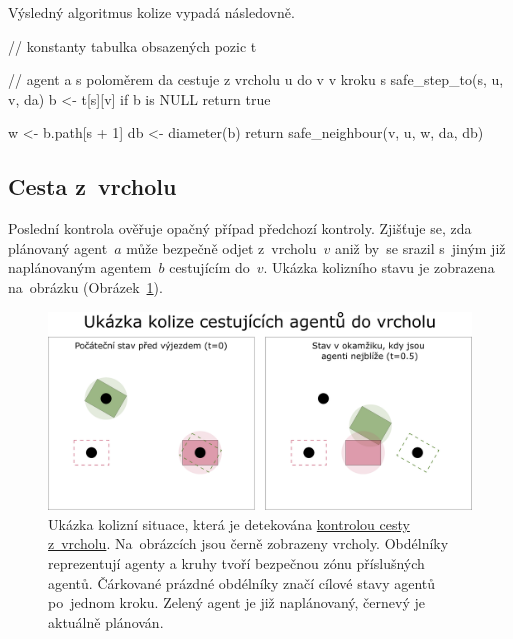Výsledný algoritmus kolize vypadá následovně.

\begin{code}[fontsize=\footnotesize]
// konstanty tabulka obsazených pozic t

// agent a s poloměrem da cestuje z vrcholu u do v v kroku s
safe_step_to(s, u, v, da)
  b <- t[s][v]
  if b is NULL
    return true

  w <- b.path[s + 1]
  db <- diameter(b)
  return safe_neighbour(v, u, w, da, db)
\end{code}

\subsection{Cesta z~vrcholu}\label{subsec:cesta_z_vrcholu}



Poslední kontrola ověřuje opačný případ předchozí kontroly.
Zjišťuje se, zda plánovaný agent~$a$ může bezpečně odjet z~vrcholu~$v$
aniž by~se srazil s~jiným již naplánovaným agentem~$b$ cestujícím do~$v$.
Ukázka kolizního stavu je zobrazena na~obrázku (Obrázek~\ref{fig:kolize_cesta_z}).

\begin{figure}[h]
	\centering
	\includegraphics[width=\textwidth]{../img/kolize_cesta_z}
	\caption{
		Ukázka kolizní situace, která je detekována \hyperref[subsec:cesta_z_vrcholu]{kontrolou cesty z~vrcholu}.
		Na~obrázcích jsou černě zobrazeny vrcholy.
		Obdélníky reprezentují agenty a kruhy tvoří bezpečnou zónu příslušných agentů.
		Čárkované prázdné obdélníky značí cílové stavy agentů po~jednom kroku.
		Zelený agent je již naplánovaný, černevý je aktuálně plánován.
	}
	\label{fig:kolize_cesta_z}
\end{figure}


